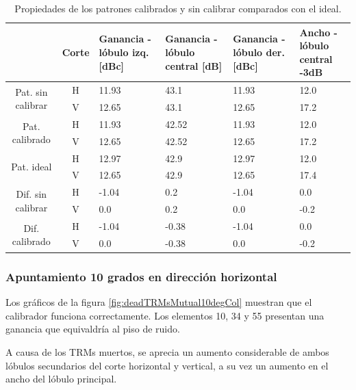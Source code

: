 \begin{table}[H]
  \footnotesize
  \centering
  \begin{tabular}{|c|c|p{2cm}|p{2.5cm}|p{2.5cm}|p{2.5cm}|}
    \cline{2-6}
    \multicolumn{1}{c|}{} & Corte & Ganancia - lóbulo izq. [dBc] & Ganancia - lóbulo central [dB] &
    Ganancia - lóbulo der. [dBc] & Ancho - lóbulo central -3dB \tabularnewline\hline
    \multirow{2}{2cm}{Pat. sin calibrar} & H & 11.93 & 43.1 & 11.93 & 12.0 \tabularnewline\cline{2-6}
     & V & 12.65 & 43.1 & 12.65 & 17.2 \tabularnewline\hline
    \multirow{2}{2cm}{Pat. calibrado} & H & 11.93 & 42.52 & 11.93 & 12.0 \tabularnewline\cline{2-6}
     & V & 12.65 & 42.52 & 12.65 & 17.2 \tabularnewline\hline
    \multirow{2}{2cm}{Pat. ideal} & H & 12.97 & 42.9 & 12.97 & 12.0 \tabularnewline\cline{2-6}
     & V & 12.65 & 42.9 & 12.65 & 17.4 \tabularnewline\hline
    \multirow{2}{2cm}{Dif. sin calibrar} & H & -1.04 & 0.2 & -1.04 & 0.0\tabularnewline\cline{2-6}
     & V & 0.0 & 0.2 & 0.0 & -0.2 \tabularnewline\hline
    \multirow{2}{2cm}{Dif. calibrado} & H & -1.04 & -0.38 & -1.04 & 0.0 \tabularnewline\cline{2-6}
     & V & 0.0 & -0.38 & 0.0 & -0.2 \tabularnewline\hline
  \end{tabular}
  \caption{Propiedades de los patrones calibrados y sin calibrar comparados con el ideal.}
  \label{tab:deadTRMsMutual0deg}
\end{table}


\subsubsection{Apuntamiento 10 grados en dirección horizontal}

Los gráficos de la figura \ref{fig:deadTRMsMutual10degCol} muestran que el calibrador funciona correctamente. Los elementos 10, 
34 y 55 presentan una ganancia que equivaldría al piso de ruido.

A causa de los TRMs muertos, se aprecia un aumento considerable de ambos lóbulos secundarios del corte horizontal y vertical, 
a su vez un aumento en el ancho del lóbulo principal.

